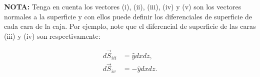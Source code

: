 \documentclass{article}
\begin{document}
\begin{enumerate}
\textbf{NOTA:} Tenga en cuenta los vectores (i), (ii), (iii), (iv) y (v) son los vectores normales a la superficie y con ellos puede definir los diferenciales de superficie de cada cara de la caja. Por ejemplo, note que el diferencial de superficie de las caras (iii) y (iv) son respectivamente:

\begin{align*}
d\vec{S}_{iii}&=\hat{y}dxdz,\\
d\vec{S}_{iv}&=-\hat{y}dxdz.
\end{align*}

\end{enumerate}
\end{document}
